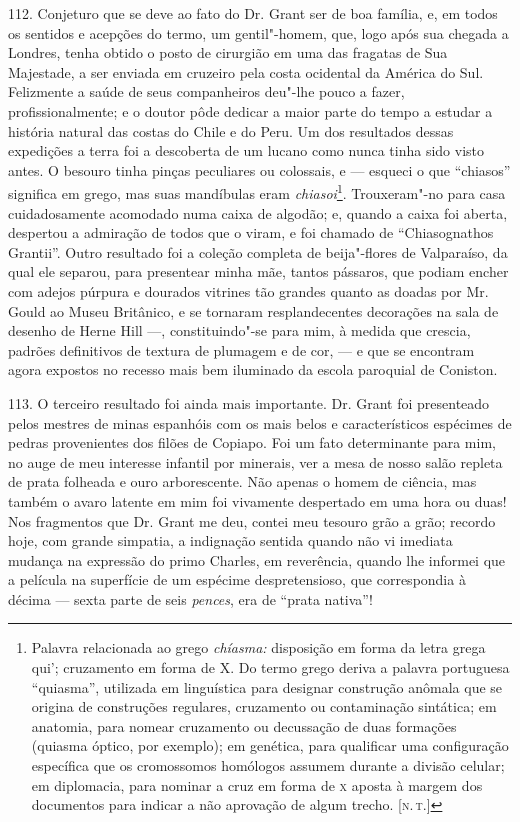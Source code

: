 112. Conjeturo que se deve ao fato do Dr. Grant ser de boa família, e,
em todos os sentidos e acepções do termo, um gentil"-homem, que, logo
após sua chegada a Londres, tenha obtido o posto de cirurgião em uma das
fragatas de Sua Majestade, a ser enviada em cruzeiro pela costa
ocidental da América do Sul. Felizmente a saúde de seus companheiros
deu"-lhe pouco a fazer, profissionalmente; e o doutor pôde dedicar a
maior parte do tempo a estudar a história natural das costas do Chile e
do Peru. Um dos resultados dessas expedições a terra foi a descoberta de
um lucano como nunca tinha sido visto antes. O besouro tinha pinças
peculiares ou colossais, e --- esqueci o que ``chiasos'' significa em
grego, mas suas mandíbulas eram \emph{chiasoi}\footnote{Palavra
  relacionada ao grego \emph{chíasma:} disposição em forma da letra
  grega qui'; cruzamento em forma de X. Do termo grego deriva a palavra
  portuguesa ``quiasma'', utilizada em linguística para designar
  construção anômala que se origina de construções regulares, cruzamento
  ou contaminação sintática; em anatomia, para nomear cruzamento ou
  decussação de duas formações (quiasma óptico, por exemplo); em
  genética, para qualificar uma configuração específica que os
  cromossomos homólogos assumem durante a divisão celular; em
  diplomacia, para nominar a cruz em forma de \textsc{x} aposta à margem dos
  documentos para indicar a não aprovação de algum trecho. {[}\textsc{n.\,t.}{]}}. Trouxeram"-no para casa cuidadosamente acomodado numa caixa de
algodão; e, quando a caixa foi aberta, despertou a admiração de todos
que o viram, e foi chamado de ``Chiasognathos Grantii''. Outro resultado
foi a coleção completa de beija"-flores de Valparaíso, da qual ele
separou, para presentear minha mãe, tantos pássaros, que podiam encher
com adejos púrpura e dourados vitrines tão grandes quanto as doadas por
Mr.\,Gould ao Museu Britânico, e se tornaram resplandecentes decorações na
sala de desenho de Herne Hill ---, constituindo"-se para mim, à medida que
crescia, padrões definitivos de textura de plumagem e de cor, --- e que se
encontram agora expostos no recesso mais bem iluminado da escola
paroquial de Coniston.

113. O terceiro resultado foi ainda mais importante. Dr. Grant foi
presenteado pelos mestres de minas espanhóis com os mais belos e
característicos espécimes de pedras provenientes dos filões de Copiapo.
Foi um fato determinante para mim, no auge de meu interesse infantil por
minerais, ver a mesa de nosso salão repleta de prata folheada e ouro
arborescente. Não apenas o homem de ciência, mas também o avaro latente
em mim foi vivamente despertado em uma hora ou duas! Nos fragmentos que
Dr. Grant me deu, contei meu tesouro grão a grão; recordo hoje, com
grande simpatia, a indignação sentida quando não vi imediata mudança na
expressão do primo Charles, em reverência, quando lhe informei que a
película na superfície de um espécime despretensioso, que correspondia à
décima --- sexta parte de seis \emph{pences}, era de ``prata nativa''!

